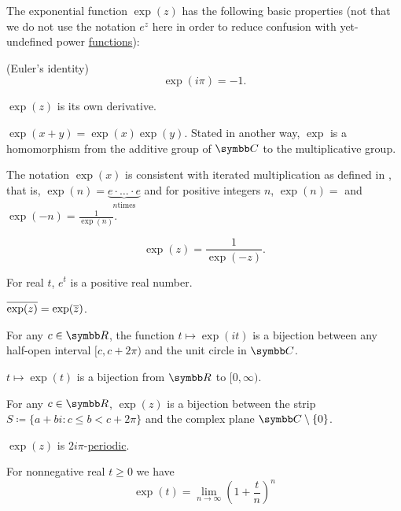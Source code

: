 \begin{proposition}\label{thm:exponential_function_properties}
  The exponential function \( \exp(z) \) has the following basic properties (not that we do not use the notation \( e^z \) here in order to reduce confusion with yet-undefined power \hyperref[def:power_function]{functions}):

  \begin{PropEnum}
     (Euler's identity)
    \begin{equation*}
      \exp(i \pi) = -1.
    \end{equation*}

     \( \exp(z) \) is its own derivative.

     \( \exp(x + y) = \exp(x) \exp(y) \). Stated in another way, \( \exp \) is a homomorphism from the additive group of \( \BC \) to the multiplicative group.

     The notation \( \exp(x) \) is consistent with iterated multiplication as defined in , that is, \( \exp(n) = \underbrace{e \cdot \ldots \cdot e}_{n \text{times}} \) and for positive integers \( n \), \( \exp(n) =  \) and \( \exp(-n) =\tfrac 1 {\exp(n)} \).

    \begin{equation*}
      \exp(z) = \frac 1 {\exp(-z)}.
    \end{equation*}

     For real \( t \), \( e^t \) is a positive real number.

     \( \overline{\exp(z)} = \exp(\overline{z}) \).

     For any \( c \in \BR \), the function \( t \mapsto \exp(it) \) is a bijection between any half-open interval \( [c, c + 2\pi) \) and the unit circle in \( \BC \).

     \( t \mapsto \exp(t) \) is a bijection from \( \BR \) to \( [0, \infty) \).

     For any \( c \in \BR \), \( \exp(z) \) is a bijection between the strip \( S \coloneqq \{ a + bi \colon c \leq b < c + 2\pi \} \) and the complex plane \( \BC \setminus \{ 0 \} \).

     \( \exp(z) \) is \( 2i\pi \)-\hyperref[def:periodic_function]{periodic}.

     For nonnegative real \( t \geq 0 \) we have
    \begin{equation*}
      \exp(t) = \lim_{n \to \infty} \left(1 + \frac t n \right)^n
    \end{equation*}
  \end{PropEnum}
\end{proposition}
